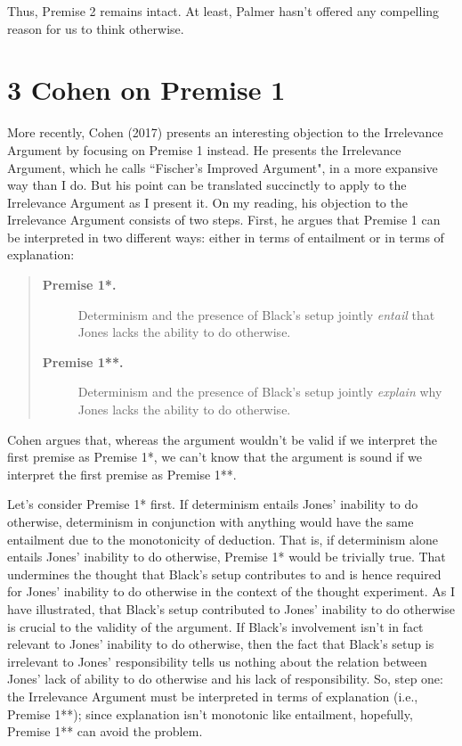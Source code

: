 \documentclass[a4paper,12pt]{article}
\begin{document}
Thus, Premise 2 remains intact. At least, Palmer hasn't offered any compelling reason for us to think otherwise.

\section*{3 Cohen on Premise 1}

More recently, Cohen (2017) presents an interesting objection to the Irrelevance Argument by focusing on Premise 1 instead. He presents the Irrelevance Argument, which he calls ``Fischer's Improved Argument", in a more expansive way than I do. But his point can be translated succinctly to apply to the Irrelevance Argument as I present it. On my reading, his objection to the Irrelevance Argument consists of two steps. First, he argues that Premise 1 can be interpreted in two different ways: either in terms of entailment or in terms of explanation:

\begin{quote}
\begin{description}
\item[\textbf{Premise 1*.}] Determinism and the presence of Black's setup jointly \emph{entail} that Jones lacks the ability to do otherwise.
\item[\textbf{Premise 1**.}] Determinism and the presence of Black's setup jointly \emph{explain} why Jones lacks the ability to do otherwise.
\end{description}
\end{quote}

Cohen argues that, whereas the argument wouldn't be valid if we interpret the first premise as Premise 1*, we can't know that the argument is sound if we interpret the first premise as Premise 1**.

Let's consider Premise 1* first. If determinism entails Jones' inability to do otherwise, determinism in conjunction with anything would have the same entailment due to the monotonicity of deduction. That is, if determinism alone entails Jones' inability to do otherwise, Premise 1* would be trivially true. That undermines the thought that Black's setup contributes to and is hence required for Jones' inability to do otherwise in the context of the thought experiment. As I have illustrated, that Black's setup contributed to Jones' inability to do otherwise is crucial to the validity of the argument. If Black's involvement isn't in fact relevant to Jones' inability to do otherwise, then the fact that Black's setup is irrelevant to Jones' responsibility tells us nothing about the relation between Jones' lack of ability to do otherwise and his lack of responsibility. So, step one: the Irrelevance Argument must be interpreted in terms of explanation (i.e., Premise 1**); since explanation isn't monotonic like entailment, hopefully, Premise 1** can avoid the problem.
\end{document}
